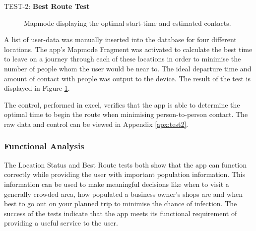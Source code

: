 TEST-2: \textbf{Best Route Test}

\begin{figure}[!htbp]
    \centering
    \caption{Mapmode displaying the optimal start-time and estimated contacts.}
    \label{fig:result_mapmode} 
\end{figure}

A list of user-data was manually inserted into the database for four different locations. The app's Mapmode Fragment was activated to calculate the best time to leave on a journey through each of these locations in order to minimise the number of people whom the user would be near to. The ideal departure time and amount of contact with people was output to the device. The result of the test is displayed in Figure \ref{fig:result_mapmode}.

The control, performed in excel, verifies that the app is able to determine the optimal time to begin the route when minimising person-to-person contact. The raw data and control can be viewed in Appendix \ref{apx:test2}.

\subsubsection{Functional Analysis}

The Location Status and Best Route tests both show that the app can function correctly while providing the user with important population information. This information can be used to make meaningful decisions like when to visit a generally crowded area, how populated a business owner's shops are and when best to go out on your planned trip to minimise the chance of infection. The success of the tests indicate that the app meets its functional requirement of providing a useful service to the user.

